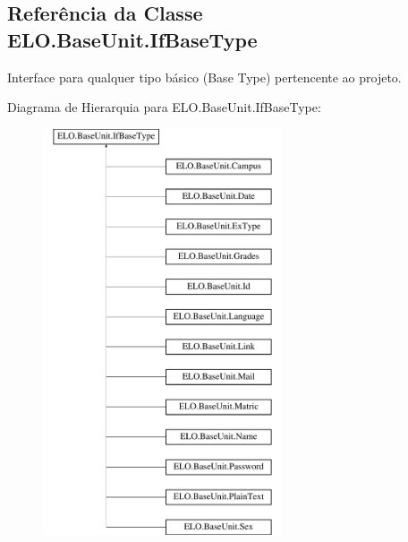 \hypertarget{classELO_1_1BaseUnit_1_1IfBaseType}{\subsection{Referência da Classe E\-L\-O.\-Base\-Unit.\-If\-Base\-Type}
\label{classELO_1_1BaseUnit_1_1IfBaseType}
}


Interface para qualquer tipo básico (Base Type) pertencente ao projeto.  


Diagrama de Hierarquia para E\-L\-O.\-Base\-Unit.\-If\-Base\-Type\-:\begin{figure}[H]
\begin{center}
\leavevmode
\includegraphics[height=12.000000cm]{d7/d79/classELO_1_1BaseUnit_1_1IfBaseType}
\end{center}
\end{figure}
